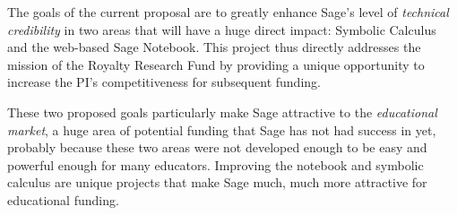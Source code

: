 \documentclass[11pt]{article}
\begin{document}
The goals of the current proposal are to greatly enhance Sage's level
of {\em technical credibility} in two areas that will have a huge
direct impact: Symbolic Calculus and the web-based Sage Notebook.
This project thus directly addresses the mission of the Royalty
Research Fund by providing a unique opportunity to increase the PI's
competitiveness for subsequent funding.

These two proposed goals particularly make Sage attractive to the {\em
  educational market}, a huge area of potential funding that Sage has
not had success in yet, probably because these two areas were not
developed enough to be easy and powerful enough for many educators.
Improving the notebook and symbolic calculus are unique projects that
make Sage much, much more attractive for educational funding.
\end{document}
